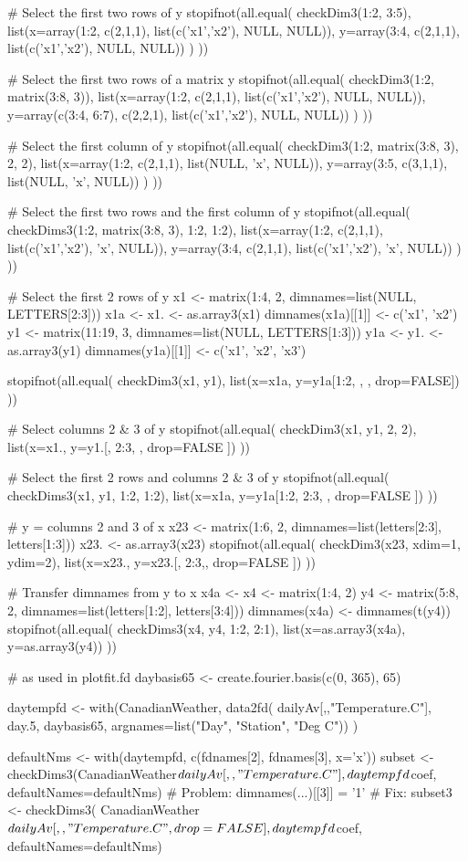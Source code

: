 \begin{Examples}
\begin{ExampleCode}
# Select the first two rows of y 
stopifnot(all.equal( 
checkDim3(1:2, 3:5),
list(x=array(1:2, c(2,1,1), list(c('x1','x2'), NULL, NULL)), 
     y=array(3:4, c(2,1,1), list(c('x1','x2'), NULL, NULL)) )
)) 

# Select the first two rows of a matrix y 
stopifnot(all.equal(
checkDim3(1:2, matrix(3:8, 3)),
list(x=array(1:2,         c(2,1,1), list(c('x1','x2'), NULL, NULL)), 
     y=array(c(3:4, 6:7), c(2,2,1), list(c('x1','x2'), NULL, NULL)) )
))

# Select the first column of y
stopifnot(all.equal(
checkDim3(1:2, matrix(3:8, 3), 2, 2), 
list(x=array(1:2,         c(2,1,1), list(NULL, 'x', NULL)), 
     y=array(3:5, c(3,1,1), list(NULL, 'x', NULL)) )
))

# Select the first two rows and the first column of y
stopifnot(all.equal(
checkDims3(1:2, matrix(3:8, 3), 1:2, 1:2),
list(x=array(1:2, c(2,1,1), list(c('x1','x2'), 'x', NULL)), 
     y=array(3:4, c(2,1,1), list(c('x1','x2'), 'x', NULL)) ) 
))

# Select the first 2 rows of y 
x1 <- matrix(1:4, 2, dimnames=list(NULL, LETTERS[2:3]))
x1a <- x1. <- as.array3(x1)
dimnames(x1a)[[1]] <- c('x1', 'x2') 
y1 <- matrix(11:19, 3, dimnames=list(NULL, LETTERS[1:3]))
y1a <- y1. <- as.array3(y1) 
dimnames(y1a)[[1]] <- c('x1', 'x2', 'x3')

stopifnot(all.equal(
checkDim3(x1, y1),
list(x=x1a, y=y1a[1:2, , , drop=FALSE])
))

# Select columns 2 & 3 of y 
stopifnot(all.equal(
checkDim3(x1, y1, 2, 2),
list(x=x1., y=y1.[, 2:3, , drop=FALSE ])
))

# Select the first 2 rows and  columns 2 & 3 of y 
stopifnot(all.equal(
checkDims3(x1, y1, 1:2, 1:2),
list(x=x1a, y=y1a[1:2, 2:3, , drop=FALSE ])
)) 

# y = columns 2 and 3 of x 
x23 <- matrix(1:6, 2, dimnames=list(letters[2:3], letters[1:3]))
x23. <- as.array3(x23) 
stopifnot(all.equal(
checkDim3(x23, xdim=1, ydim=2),
list(x=x23., y=x23.[, 2:3,, drop=FALSE ])
))

# Transfer dimnames from y to x
x4a <- x4 <- matrix(1:4, 2)
y4 <- matrix(5:8, 2, dimnames=list(letters[1:2], letters[3:4]))
dimnames(x4a) <- dimnames(t(y4))
stopifnot(all.equal(
checkDims3(x4, y4, 1:2, 2:1),
list(x=as.array3(x4a), y=as.array3(y4))
))

# as used in plotfit.fd
daybasis65 <- create.fourier.basis(c(0, 365), 65)

daytempfd <- with(CanadianWeather, data2fd(
       dailyAv[,,"Temperature.C"], day.5, 
       daybasis65, argnames=list("Day", "Station", "Deg C")) )

defaultNms <- with(daytempfd, c(fdnames[2], fdnames[3], x='x'))
subset <- checkDims3(CanadianWeather$dailyAv[, , "Temperature.C"],
               daytempfd$coef, defaultNames=defaultNms)
# Problem:  dimnames(...)[[3]] = '1' 
# Fix:  
subset3 <- checkDims3(
        CanadianWeather$dailyAv[, , "Temperature.C", drop=FALSE],
               daytempfd$coef, defaultNames=defaultNms)
\end{ExampleCode}
\end{Examples}

